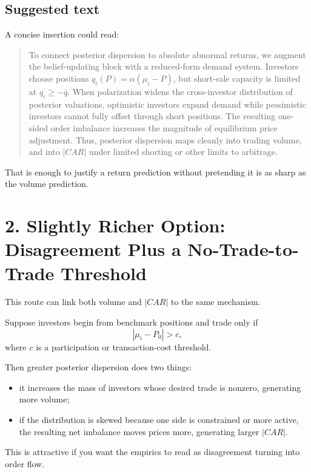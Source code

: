 \documentclass[11pt]{article}
\begin{document}
\subsection*{Suggested text}
A concise insertion could read:

\begin{quote}
To connect posterior dispersion to absolute abnormal returns, we augment the belief-updating block with a reduced-form demand system. Investors choose positions $q_i(P)=\alpha(\mu_i-P)$, but short-sale capacity is limited at $q_i\geq -\bar q$. When polarization widens the cross-investor distribution of posterior valuations, optimistic investors expand demand while pessimistic investors cannot fully offset through short positions. The resulting one-sided order imbalance increases the magnitude of equilibrium price adjustment. Thus, posterior dispersion maps cleanly into trading volume, and into $|CAR|$ under limited shorting or other limits to arbitrage.
\end{quote}

That is enough to justify a return prediction without pretending it is as sharp as the volume prediction.

\section*{2. Slightly Richer Option: Disagreement Plus a No-Trade-to-Trade Threshold}
This route can link both volume and $|CAR|$ to the same mechanism.

Suppose investors begin from benchmark positions and trade only if
\[
|\mu_i-P_0|>c,
\]
where $c$ is a participation or transaction-cost threshold.

Then greater posterior dispersion does two things:
\begin{itemize}[leftmargin=1.5em]
    \item it increases the mass of investors whose desired trade is nonzero, generating more volume;
    \item if the distribution is skewed because one side is constrained or more active, the resulting net imbalance moves prices more, generating larger $|CAR|$.
\end{itemize}
This is attractive if you want the empirics to read as disagreement turning into order flow.
\end{document}
